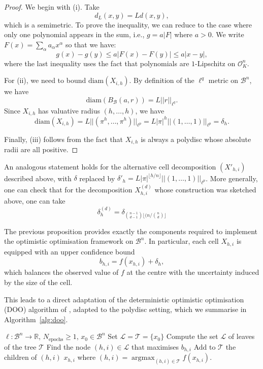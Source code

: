 \documentclass[10pt]{article}
\theoremstyle{definition}
\newcommand{\RR}{\mathbb{R}}
\newcommand{\diam}{\text{diam}}
\DeclareMathOperator{\argmax}{argmax}
\begin{document}
\begin{proof}
    We begin with (i). Take
    $$
    d_L(x, y) = L d(x, y),
    $$
    which is a semimetric. To prove the inequality, we can reduce to the case where only one polynomial appears in the sum, i.e., $g = a \lvert F \rvert$ where $a > 0$. 
    We write
    $
    F(x) = \sum_\alpha a_\alpha x^\alpha
    $
    so that we have: 
    $$
    g(x) - g(y) \le a \lvert F (x) - F(y) \rvert \le a \lvert x - y \rvert,
    $$
    where the last inequality uses the fact that polynomials are $1$-Lipschitz on $\mathcal{O}_K^n$.
    
    For (ii), we need to bound $\diam(X_{i, h})$. By definition of the $\ell^q$ metric on $\mathcal{B}^n$, we have
    $$
    \diam(B_{\mathcal{B}}(a, r)) = L \lvert \lvert r \rvert \rvert_{\ell^q}.
    $$
    Since $X_{i, h}$ has valuative radius $(h, \dotsc, h)$, we have
    $$
        \diam(X_{i, h}) = L \lvert \lvert (\pi^{h}, \dotsc, \pi^{h}) \rvert \rvert_{\ell^p} = L\lvert \pi \rvert^{h} \lvert \lvert (1, \dotsc, 1) \rvert \rvert_{\ell^p} = \delta_h.
    $$

    Finally, (iii) follows from the fact that $X_{i, h}$ is always a polydisc whose absolute radii are all positive.
\end{proof}

An analogous statement holds for the alternative cell decomposition $(X'_{h,i})$ described above, with $\delta$ replaced by $\delta'_h = L\lvert \pi \rvert^{\lfloor h / n \rfloor } \lvert \lvert (1, \dotsc, 1) \rvert \rvert_{\ell^p}$. More generally, one can check that for the decomposition $X^{(d)}_{h, i}$ whose construction was sketched above, one can take 
$$
\delta^{(d)}_h = \delta_{\binom{n-1}{d-1}\lfloor ({n} /{\binom{n}{d}}\rfloor}
$$

The previous proposition provides exactly the components required to implement the optimistic optimisation framework on $\mathcal{B}^n$. In particular, each cell $X_{h,i}$ is equipped with an upper confidence bound 
$$
b_{h,i} = f(x_{h,i}) + \delta_h,
$$
which balances the observed value of $f$ at the centre with the uncertainty induced by the size of the cell. 

This leads to a direct adaptation of the deterministic optimistic optimisation (DOO) algorithm of \cite{munos2011optimistic}, adapted to the polydisc setting, which we summarise in Algorithm~\ref{alg:doo}.


\begin{algorithm}
  \begin{algorithmic}[1]
    \Require $\ell \colon \mathcal{B}^n \to \RR$, $N_\mathrm{epochs} \ge 1$, $x_0 \in \mathcal{B}^n$
    \State Set $\mathcal{L} = \mathcal{T} = \{x_0\}$
      \State Compute the set $\mathcal{L}$ of leaves of the tree $\mathcal{T}$
      \State Find the node $(h, i) \in \mathcal{L}$ that maximises $b_{h, i}$
      \State Add to $\mathcal{T}$ the children of $(h, i)$ 
    \EndFor
  \Return $x_{h, i}$ where $(h, i) = \argmax_{(h, i) \in \mathcal{T}} f(x_{h, i})$.
  \end{algorithmic}
  \caption{Polydisc Space DOO}
  \label{alg:doo}
\end{algorithm}
\end{document}
